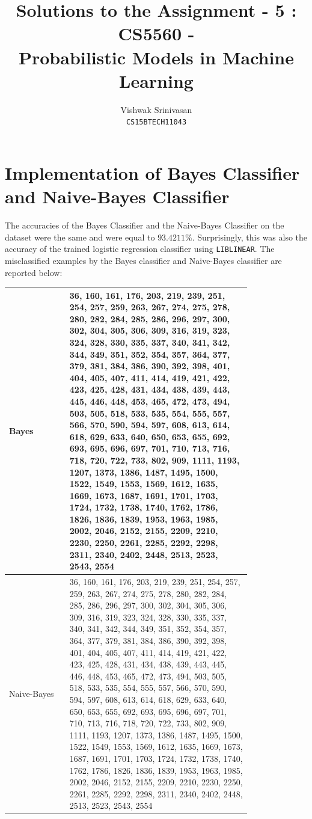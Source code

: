 \documentclass{article}
\title{Solutions to the Assignment - 5 : CS5560 - \\
Probabilistic Models in Machine Learning}
\author{Vishwak Srinivasan\\
\texttt{CS15BTECH11043}}
\date{}
\begin{document}
\maketitle

\section*{Implementation of Bayes Classifier and Naive-Bayes Classifier}
\begin{flushleft}
The accuracies of the Bayes Classifier and the Naive-Bayes Classifier on the dataset were the same and were equal to \(93.4211\%\). Surprisingly, this was also the accuracy of the trained logistic regression classifier using \texttt{LIBLINEAR}. The misclassified examples by the Bayes classifier and Naive-Bayes classifier are reported below:
\begin{center}
\begin{tabular}{|p{0.2\linewidth}|p{0.6\linewidth}|}
\hline
Bayes & 36, 160, 161, 176, 203, 219, 239, 251, 254, 257, 259, 263, 267, 274, 275, 278, 280, 282, 284, 285, 286, 296, 297, 300, 302, 304, 305, 306, 309, 316, 319, 323, 324, 328, 330, 335, 337, 340, 341, 342, 344, 349, 351, 352, 354, 357, 364, 377, 379, 381, 384, 386, 390, 392, 398, 401, 404, 405, 407, 411, 414, 419, 421, 422, 423, 425, 428, 431, 434, 438, 439, 443, 445, 446, 448, 453, 465, 472, 473, 494, 503, 505, 518, 533, 535, 554, 555, 557, 566, 570, 590, 594, 597, 608, 613, 614, 618, 629, 633, 640, 650, 653, 655, 692, 693, 695, 696, 697, 701, 710, 713, 716, 718, 720, 722, 733, 802, 909, 1111, 1193, 1207, 1373, 1386, 1487, 1495, 1500, 1522, 1549, 1553, 1569, 1612, 1635, 1669, 1673, 1687, 1691, 1701, 1703, 1724, 1732, 1738, 1740, 1762, 1786, 1826, 1836, 1839, 1953, 1963, 1985, 2002, 2046, 2152, 2155, 2209, 2210, 2230, 2250, 2261, 2285, 2292, 2298, 2311, 2340, 2402, 2448, 2513, 2523, 2543, 2554\\
\hline
Naive-Bayes & 36, 160, 161, 176, 203, 219, 239, 251, 254, 257, 259, 263, 267, 274, 275, 278, 280, 282, 284, 285, 286, 296, 297, 300, 302, 304, 305, 306, 309, 316, 319, 323, 324, 328, 330, 335, 337, 340, 341, 342, 344, 349, 351, 352, 354, 357, 364, 377, 379, 381, 384, 386, 390, 392, 398, 401, 404, 405, 407, 411, 414, 419, 421, 422, 423, 425, 428, 431, 434, 438, 439, 443, 445, 446, 448, 453, 465, 472, 473, 494, 503, 505, 518, 533, 535, 554, 555, 557, 566, 570, 590, 594, 597, 608, 613, 614, 618, 629, 633, 640, 650, 653, 655, 692, 693, 695, 696, 697, 701, 710, 713, 716, 718, 720, 722, 733, 802, 909, 1111, 1193, 1207, 1373, 1386, 1487, 1495, 1500, 1522, 1549, 1553, 1569, 1612, 1635, 1669, 1673, 1687, 1691, 1701, 1703, 1724, 1732, 1738, 1740, 1762, 1786, 1826, 1836, 1839, 1953, 1963, 1985, 2002, 2046, 2152, 2155, 2209, 2210, 2230, 2250, 2261, 2285, 2292, 2298, 2311, 2340, 2402, 2448, 2513, 2523, 2543, 2554\\
\hline
\end{tabular}
\end{center}
\end{flushleft}
\end{document}
